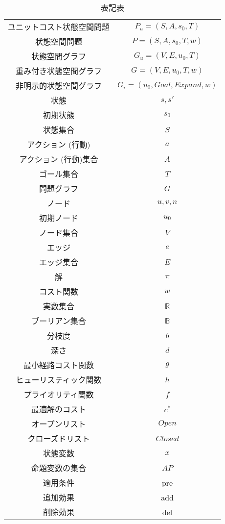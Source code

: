 \begin{table}
	\centering
	\begin{tabular}{c | c}
	ユニットコスト状態空間問題 & $P_{u} = (S, A, s_0, T)$ \\
	状態空間問題 & $P = (S, A, s_0, T, w)$ \\
	状態空間グラフ & $G_{u} = (V, E, u_0, T)$ \\
	重み付き状態空間グラフ & $G = (V, E, u_0, T, w)$ \\
	非明示的状態空間グラフ & $G_{i} = (u_0, Goal, Expand, w)$ \\
	状態 & $s, s'$ \\ 
	初期状態 & $s_0$ \\ 
	状態集合 & $S$ \\
	アクション (行動) & $a$ \\
	アクション (行動)集合 & $A$ \\
	ゴール集合 & $T$ \\
	問題グラフ & $G$ \\
	ノード & $u, v, n$ \\
	初期ノード & $u_0$ \\
	ノード集合 & $V$ \\
	エッジ & $e$ \\
	エッジ集合 & $E$ \\
	解 & $\pi$ \\
	コスト関数 & $w$ \\
	実数集合 & $\mathbb{R}$ \\
	ブーリアン集合 & $\mathbb{B}$ \\
	分枝度 & $b$ \\
	深さ & $d$ \\
	最小経路コスト関数 & $g$ \\
	ヒューリスティック関数 & $h$ \\
	プライオリティ関数 & $f$ \\
	最適解のコスト & $c^*$ \\
	オープンリスト & $Open$ \\
	クローズドリスト & $Closed$ \\
	状態変数 & $x$ \\
	命題変数の集合 & $AP$ \\
	適用条件 & pre \\
	追加効果 & add \\
	削除効果 & del \\
	\end{tabular}
	\caption{表記表}
	\label{notation}
\end{table}
